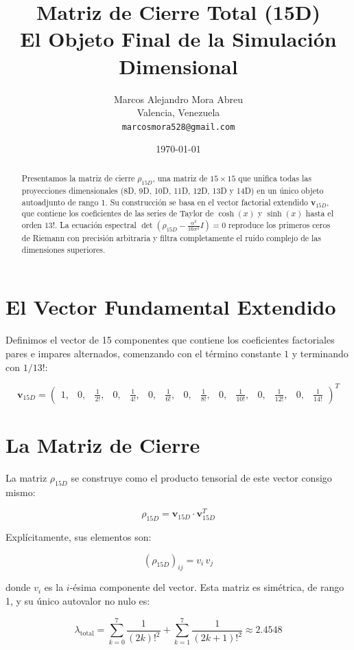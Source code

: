 \documentclass[12pt,a4paper]{article}
\title{Matriz de Cierre Total (15D) \\ 
       \large El Objeto Final de la Simulación Dimensional}
\author{Marcos Alejandro Mora Abreu \\ 
        \small Valencia, Venezuela \\ 
        \texttt{marcosmora528@gmail.com}}
\date{\today}
\begin{document}
\maketitle

\begin{abstract}
Presentamos la matriz de cierre \(\rho_{15D}\), una matriz de \(15\times 15\) que unifica todas las proyecciones dimensionales (8D, 9D, 10D, 11D, 12D, 13D y 14D) en un único objeto autoadjunto de rango 1. Su construcción se basa en el vector factorial extendido \(\mathbf{v}_{15D}\), que contiene los coeficientes de las series de Taylor de \(\cosh(x)\) y \(\sinh(x)\) hasta el orden \(13!\). La ecuación espectral \(\det(\rho_{15D} - \frac{\alpha^2}{16\pi^2} I)=0\) reproduce los primeros ceros de Riemann con precisión arbitraria y filtra completamente el ruido complejo de las dimensiones superiores.
\end{abstract}

\section{El Vector Fundamental Extendido}

Definimos el vector de 15 componentes que contiene los coeficientes factoriales pares e impares alternados, comenzando con el término constante \(1\) y terminando con \(1/13!\):

\[
\mathbf{v}_{15D} = 
\begin{pmatrix}
1, & 0, & \frac{1}{2!}, & 0, & \frac{1}{4!}, & 0, & \frac{1}{6!}, & 0, & \frac{1}{8!}, & 0, & \frac{1}{10!}, & 0, & \frac{1}{12!}, & 0, & \frac{1}{14!}
\end{pmatrix}^T
\]

\section{La Matriz de Cierre}

La matriz \(\rho_{15D}\) se construye como el producto tensorial de este vector consigo mismo:

\[
\boxed{ \rho_{15D} = \mathbf{v}_{15D} \cdot \mathbf{v}_{15D}^T }
\]

Explícitamente, sus elementos son:

\[
(\rho_{15D})_{ij} = v_i \, v_j
\]

donde \(v_i\) es la \(i\)-ésima componente del vector. Esta matriz es simétrica, de rango 1, y su único autovalor no nulo es:

\[
\lambda_{\text{total}} = \sum_{k=0}^{7} \frac{1}{(2k)!^2} + \sum_{k=1}^{7} \frac{1}{(2k+1)!^2} \approx 2.4548
\]
\end{document}
